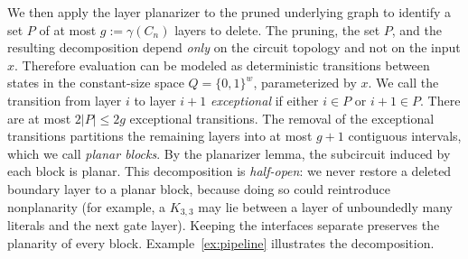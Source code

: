 \documentclass[11pt]{article}
\theoremstyle{definition}
\theoremstyle{remark}
\newcommand{\genus}{\gamma}
\begin{document}
We then apply the layer planarizer to the pruned underlying graph to identify a set $P$ of at most $g := \genus(C_n)$ layers to delete. The pruning, the set $P$, and the resulting decomposition depend \emph{only} on the circuit topology and not on the input $x$. Therefore evaluation can be modeled as deterministic transitions between states in the constant-size space $Q = \{0,1\}^w$, parameterized by $x$. We call the transition from layer $i$ to layer $i+1$ \emph{exceptional} if either $i \in P$ or $i+1 \in P$. There are at most $2|P| \le 2g$ exceptional transitions.
The removal of the exceptional transitions partitions the remaining layers into at most $g+1$ contiguous intervals, which we call \emph{planar blocks}. By the planarizer lemma, the subcircuit induced by each block is planar.
This decomposition is \emph{half-open}: we never restore a deleted boundary layer to a planar block, because doing so could reintroduce nonplanarity (for example, a $K_{3,3}$ may lie between a layer of unboundedly many literals and the next gate layer). Keeping the interfaces separate preserves the planarity of every block. Example~\ref{ex:pipeline} illustrates the decomposition.
\end{document}
